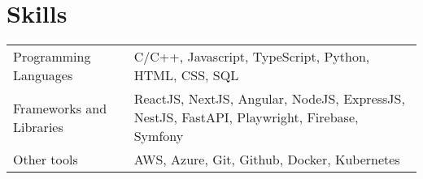 \documentclass[a4paper,12pt]{article}
\begin{document}
\section{Skills}
\begin{tabularx}{\linewidth}{@{}l X@{}}
Programming Languages &  \normalsize{C/C++, Javascript, TypeScript, Python, HTML, CSS, SQL}\\
Frameworks and Libraries  &  \normalsize{ReactJS, NextJS, Angular, NodeJS, ExpressJS, NestJS, FastAPI, Playwright, Firebase, Symfony}\\
Other tools  &  \normalsize{AWS, Azure, Git, Github, Docker, Kubernetes}\\
\end{tabularx}
\end{document}
